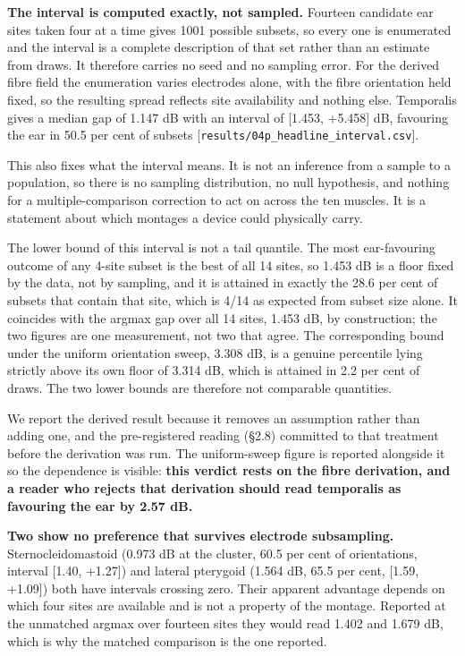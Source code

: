 \documentclass[
  11pt,
  letterpaper,
]{article}
\begin{document}
\textbf{The interval is computed exactly, not sampled.} Fourteen candidate ear sites
taken four at a time gives 1001 possible subsets, so every one is enumerated and
the interval is a complete description of that set rather than an estimate from
draws. It therefore carries no seed and no sampling error. For the derived fibre
field the enumeration varies electrodes alone, with the fibre orientation held
fixed, so the resulting spread reflects site availability and nothing else.
Temporalis gives a median gap of \textminus{}1.147 dB with an interval of
{[}\textminus{}1.453, +5.458{]} dB, favouring the ear in 50.5 per cent of subsets
{[}\texttt{results/04p\_headline\_interval.csv}{]}.

This also fixes what the interval means. It is not an inference from a sample to
a population, so there is no sampling distribution, no null hypothesis, and
nothing for a multiple-comparison correction to act on across the ten muscles.
It is a statement about which montages a device could physically carry.

The lower bound of this interval is not a tail quantile. The most ear-favouring
outcome of any 4-site subset is the best of all 14 sites, so \textminus{}1.453 dB is a
floor fixed by the data, not by sampling, and it is attained in exactly the 28.6
per cent of subsets that contain that site, which is 4/14 as expected from
subset size alone. It coincides with the argmax gap over all 14 sites, \textminus{}1.453
dB, by construction; the two figures are one measurement, not two that agree.
The corresponding bound under the uniform orientation sweep, \textminus{}3.308 dB, is a
genuine percentile lying strictly above its own floor of \textminus{}3.314 dB, which is
attained in 2.2 per cent of draws. The two lower bounds are therefore not
comparable quantities.

We report the derived result because it removes an assumption rather than
adding one, and the pre-registered reading (\S{}2.8) committed to that treatment
before the derivation was run. The uniform-sweep figure is reported alongside
it so the dependence is visible: \textbf{this verdict rests on the fibre derivation,
and a reader who rejects that derivation should read temporalis as favouring
the ear by 2.57 dB.}

\textbf{Two show no preference that survives electrode subsampling.}
Sternocleidomastoid (\textminus{}0.973 dB at the cluster, 60.5 per cent of orientations,
interval {[}\textminus{}1.40, +1.27{]}) and lateral pterygoid (\textminus{}1.564 dB, 65.5 per cent,
{[}\textminus{}1.59, +1.09{]}) both have intervals crossing zero. Their apparent advantage
depends on which four sites are available and is not a property of the
montage. Reported at the unmatched argmax over fourteen sites they would read
\textminus{}1.402 and \textminus{}1.679 dB, which is why the matched comparison is the one reported.
\end{document}

